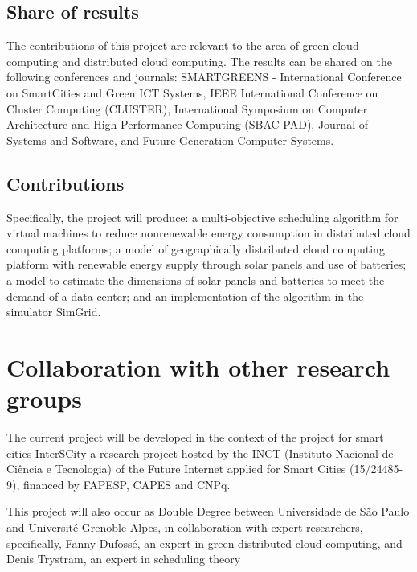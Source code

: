 \documentclass[12pt,a4paper]{article}
\begin{document}
\subsection{Share of results}

The contributions of this project are relevant to the area of green cloud computing and distributed cloud computing. The results can be shared on the following conferences and journals: SMARTGREENS  - International Conference on SmartCities and Green ICT Systems, IEEE International Conference on Cluster Computing (CLUSTER), International Symposium on Computer Architecture and High Performance Computing (SBAC-PAD), Journal of Systems and Software, and  Future Generation Computer Systems.


\subsection{Contributions}

Specifically, the project will produce: a multi-objective  scheduling algorithm for virtual machines to reduce nonrenewable energy consumption in distributed cloud computing platforms; a model of geographically distributed cloud computing platform with renewable energy supply through solar panels and use of batteries; a model to estimate the dimensions of solar panels and batteries to meet the demand of a data center; and an implementation of the algorithm in the simulator SimGrid.


\section{Collaboration with other research groups}

The current project will be developed in the context of the project for smart cities InterSCity \citep{smartgreens17} a research project hosted by the INCT (Instituto Nacional de Ciência e Tecnologia) of the Future Internet applied for Smart Cities (15/24485-9), financed by FAPESP, CAPES and CNPq. 

This project will also occur as Double Degree between Universidade de São Paulo and Université Grenoble Alpes, in collaboration with expert researchers, specifically, Fanny Dufossé, an expert in green distributed cloud computing,  and Denis Trystram, an expert in scheduling theory

\singlespacing



\end{document}
